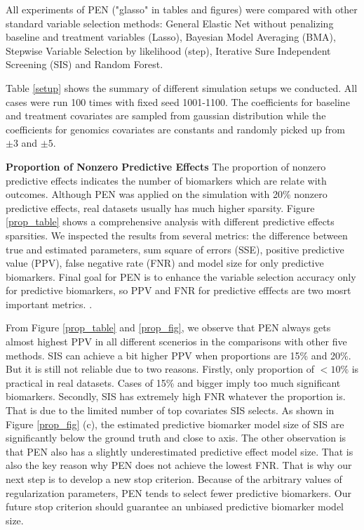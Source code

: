 \documentclass[12pt]{article}
\begin{document}
  All experiments of PEN ("glasso" in tables and figures) were compared with other standard variable selection methods: 
  General Elastic Net without penalizing baseline and treatment variables (Lasso),
  Bayesian Model Averaging (BMA), Stepwise Variable Selection by likelihood (step),
  Iterative Sure Independent Screening (SIS) and Random Forest.

Table \ref{setup} shows the summary of different simulation setups we conducted.
All cases were run 100 times with fixed seed 1001-1100. The coefficients for baseline
and treatment covariates are sampled from gaussian distribution while
the coefficients for genomics covariates are constants and randomly picked up from $\pm 3$
and $\pm 5$.

\textbf{Proportion of Nonzero Predictive Effects} The proportion of nonzero
predictive effects indicates the number of biomarkers which are relate with
outcomes. Although PEN was applied on the simulation with 20\% nonzero
predictive effects, real datasets usually has much higher sparsity. Figure \ref{prop_table}
shows a comprehensive analysis with different predictive effects sparsities.
We inspected the results from several metrics: the difference between true
and estimated parameters, sum square of errors (SSE), positive predictive
value (PPV), false negative rate (FNR) and model size for only predictive 
biomarkers. Final goal for PEN is to enhance the variable selection accuracy
only for predictive biomarkers, so PPV and FNR for predictive efffects are
two mosrt important metrics.
.

From Figure \ref{prop_table} and \ref{prop_fig}, we observe that
PEN always gets almost highest PPV in all different scenerios
in the comparisons with other five methods. SIS can achieve a bit higher
PPV when proportions are 15\% and 20\%. But it is still not reliable due
to two reasons. Firstly, only proportion of $<10\%$ is practical in real
datasets. Cases of 15\% and bigger imply too much significant biomarkers.
Secondly, SIS has extremely high FNR whatever the proportion is. That is due
to the limited number of top covariates SIS selects. As shown in Figure \ref{prop_fig} (c),
the estimated predictive biomarker model size of SIS are significantly below 
the ground truth and close to axis. The other observation is that PEN
also has a slightly underestimated predictive effect model size. That is also
the key reason why PEN does not achieve the lowest FNR. That is why 
our next step is to develop a new stop criterion. Because of the arbitrary values of regularization parameters,
PEN tends to select fewer predictive biomarkers. Our future stop criterion
should guarantee an unbiased predictive biomarker model size.
\end{document}
